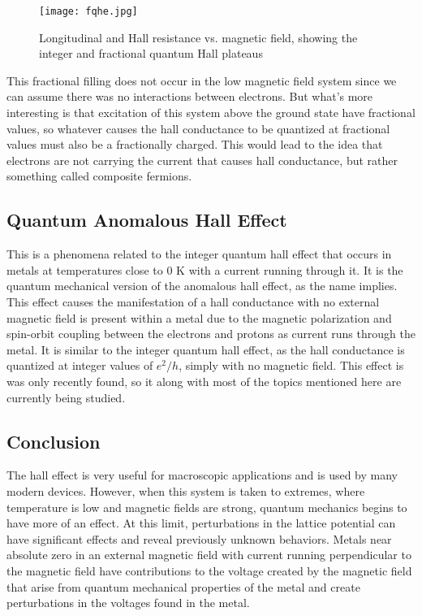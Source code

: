 \documentclass[14pt]{article}
\begin{document}
\begin{figure}[ht]
	\centering
	\texttt{[image: fqhe.jpg]}
	\label{fig:sheet5}
	\caption{Longitudinal and Hall resistance vs. magnetic field, showing the integer and fractional quantum Hall plateaus\cite{fqhepic}}
\end{figure}

This fractional filling does not occur in the low magnetic field system since we can assume there was no interactions between electrons. But what's more interesting is that excitation of this system above the ground state have fractional values, so whatever causes the hall conductance to be quantized at fractional values must also be a fractionally charged. This would lead to the idea that electrons are not carrying the current that causes hall conductance, but rather something called composite fermions\cite{fqhe talk}\cite{other}.

\subsection*{Quantum Anomalous Hall Effect}

This is a phenomena related to the integer quantum hall effect that occurs in metals at temperatures close to 0 K with a current running through it. It is the quantum mechanical version of the anomalous hall effect, as the name implies. This effect causes the manifestation of a hall conductance with no external magnetic field is present within a metal due to the magnetic polarization and spin-orbit coupling between the electrons and protons as current runs through the metal. It is similar to the integer quantum hall effect, as the hall conductance is quantized at integer values of $e^2/h$, simply with no magnetic field. This effect is was only recently found, so it along with most of the topics mentioned here are currently being studied\cite{aqhe}.

\subsection*{Conclusion}

The hall effect is very useful for macroscopic applications and is used by many modern devices. However, when this system is taken to extremes, where temperature is low and magnetic fields are strong, quantum mechanics begins to have more of an effect. At this limit, perturbations in the lattice potential can have significant effects and reveal previously unknown behaviors. Metals near absolute zero in an external magnetic field with current running perpendicular to the magnetic field have contributions to the voltage created by the magnetic field that arise from quantum mechanical properties of the metal and create perturbations in the voltages found in the metal.
\end{document}
